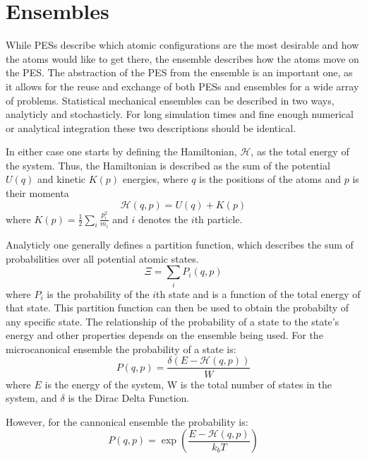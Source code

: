 \section{Ensembles} \label{sec:ens}
While PESs describe which atomic configurations are the most desirable and how the atoms would like to get there, the ensemble describes how the atoms move on the PES.
The abstraction of the PES from the ensemble is an important one, as it allows for the reuse and exchange of both PESs and ensembles for a wide array of problems.
Statistical mechanical ensembles can be described in two ways, analyticly and stochasticly.
For long simulation times and fine enough numerical or analytical integration these two descriptions should be identical.

In either case one starts by defining the Hamiltonian, $\mathcal{H}$, as the total energy of the system.
Thus, the Hamiltonian is described as the sum of the potential $U(q)$ and kinetic $K(p)$ energies, where $q$ is the positions of the atoms and $p$ is their momenta
\begin{equation} \label{Hamiltonian}
  \mathcal{H}(q, p) = U(q) + K(p)
\end{equation}
\noindent where $K(p) = \frac{1}{2}\sum_{i} \frac{p_{i}^{2}}{m_{i}}$ and $i$ denotes the $i$th particle.

Analyticly one generally defines a partition function, which describes the sum of probabilities over all potential atomic states.
\[
\Xi = \sum_{i} P_{i}(q, p)
\]
where $P_{i}$ is the probability of the $i$th state and is a function of the total energy of that state.
This partition function can then be used to obtain the probabilty of any specific state.
The relationship of the probability of a state to the state's energy and other properties depends on the ensemble being used.
For the microcanonical ensemble the probability of a state is:
\begin{equation}
P(q, p) = \frac{\delta(E - \mathcal{H}(q, p))}{W}
\end{equation}
where $E$ is the energy of the system, W is the total number of states in the system, and $\delta$ is the Dirac Delta Function.

However, for the cannonical ensemble the probability is:
\begin{equation}
P(q, p) = \exp(\frac{E-\mathcal{H}(q, p)}{k_{b}T})
\end{equation}

